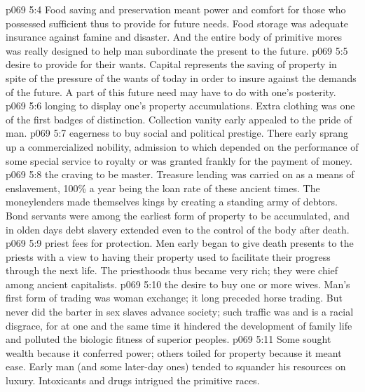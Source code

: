\vs p069 5:4 \bibnobreakspace {} Food saving and preservation meant power and comfort for those who possessed sufficient  thus to provide for future needs. Food storage was adequate insurance against famine and disaster. And the entire body of primitive mores was really designed to help man subordinate the present to the future.
\vs p069 5:5 \bibnobreakspace {} desire to provide for their wants. Capital represents the saving of property in spite of the pressure of the wants of today in order to insure against the demands of the future. A part of this future need may have to do with one’s posterity.
\vs p069 5:6 \bibnobreakspace {} longing to display one’s property accumulations. Extra clothing was one of the first badges of distinction. Collection vanity early appealed to the pride of man.
\vs p069 5:7 \bibnobreakspace {} eagerness to buy social and political prestige. There early sprang up a commercialized nobility, admission to which depended on the performance of some special service to royalty or was granted frankly for the payment of money.
\vs p069 5:8 \bibnobreakspace {} the craving to be master. Treasure lending was carried on as a means of enslavement, 100\% a year being the loan rate of these ancient times. The moneylenders made themselves kings by creating a standing army of debtors. Bond servants were among the earliest form of property to be accumulated, and in olden days debt slavery extended even to the control of the body after death.
\vs p069 5:9 \bibnobreakspace {} priest fees for protection. Men early began to give death presents to the priests with a view to having their property used to facilitate their progress through the next life. The priesthoods thus became very rich; they were chief among ancient capitalists.
\vs p069 5:10 \bibnobreakspace {} the desire to buy one or more wives. Man’s first form of trading was woman exchange; it long preceded horse trading. But never did the barter in sex slaves advance society; such traffic was and is a racial disgrace, for at one and the same time it hindered the development of family life and polluted the biologic fitness of superior peoples.
\vs p069 5:11 \bibnobreakspace {} Some sought wealth because it conferred power; others toiled for property because it meant ease. Early man (and some later\hyp{}day ones) tended to squander his resources on luxury. Intoxicants and drugs intrigued the primitive races.
